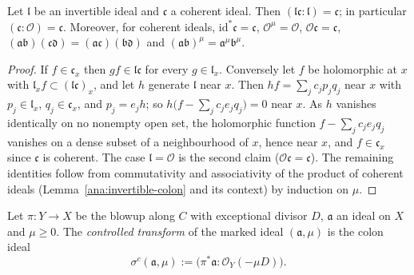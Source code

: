 \begin{lemma}
\label{bcalc:cancellation}
\leanok
Let \(\mathfrak l\) be an invertible ideal and \(\mathfrak c\) a coherent ideal. Then \((\mathfrak l\mathfrak c:\mathfrak l)=\mathfrak c\); in
particular \((\mathfrak c:\mathcal O)=\mathfrak c\). Moreover, for coherent ideals, \(\mathrm{id}^*\mathfrak c=\mathfrak c\),
\(\mathcal O^{\mu}=\mathcal O\), \(\mathcal O\mathfrak c=\mathfrak c\), \((\mathfrak a\mathfrak b)(\mathfrak c\mathfrak d)=(\mathfrak a\mathfrak c)(\mathfrak b\mathfrak d)\)
and \((\mathfrak a\mathfrak b)^{\mu}=\mathfrak a^{\mu}\mathfrak b^{\mu}\).
\end{lemma}
\begin{proof}
\leanok
If \(f\in\mathfrak c_x\) then \(gf\in\mathfrak l\mathfrak c\) for every \(g\in\mathfrak l_x\). Conversely let \(f\) be holomorphic at
\(x\) with \(\mathfrak l_xf\subset(\mathfrak l\mathfrak c)_x\), and let \(h\) generate \(\mathfrak l\) near \(x\). Then
\(hf=\sum_jc_jp_jq_j\) near \(x\) with \(p_j\in\mathfrak l_x\), \(q_j\in\mathfrak c_x\), and \(p_j=e_jh\); so
\(h\bigl(f-\sum_jc_je_jq_j\bigr)=0\) near \(x\). As \(h\) vanishes identically on no nonempty open set, the holomorphic function
\(f-\sum_jc_je_jq_j\) vanishes on a dense subset of a neighbourhood of \(x\), hence near \(x\), and \(f\in\mathfrak c_x\) since
\(\mathfrak c\) is coherent. The case \(\mathfrak l=\mathcal O\) is the second claim (\(\mathcal O\mathfrak c=\mathfrak c\)). The
remaining identities follow from commutativity and associativity of the product of coherent ideals
(Lemma~\ref{ana:invertible-colon} and its context) by induction on \(\mu\).
\end{proof}

\begin{definition}
\label{bcalc:controlled-transform-def}
\leanok
Let \(\pi\colon Y\to X\) be the blowup along \(C\) with exceptional divisor \(D\), \(\mathfrak a\) an ideal on \(X\) and
\(\mu\ge0\). The \emph{controlled transform} of the marked ideal \((\mathfrak a,\mu)\) is the colon ideal
\[
 \sigma^{c}(\mathfrak a,\mu):=\bigl(\pi^*\mathfrak a:\mathcal O_Y(-\mu D)\bigr).
\]
\end{definition}

